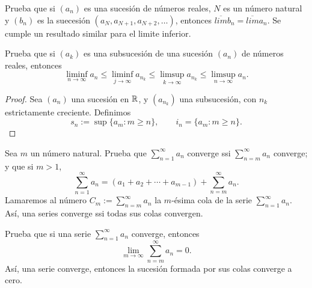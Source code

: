\documentclass[12pt,a4paper]{article}
\begin{document}
    \begin{mdframed}[style=mdpinkbox,frametitle={Ejercicio 5}]
        Prueba que si $(a_{n})$ es una sucesión de números reales, $N$ es un número natural y $(b_{n})$ es la suecesión
        $(a_{N},a_{N+1},a_{N+2},\dots)$, entonces $\overline{lim}b_{n}=\overline{lim}a_{n}$. Se cumple un resultado similar
        para el limite inferior.
    \end{mdframed}

    \begin{mdframed}[style=mdpinkbox,frametitle={Ejercicio 6}]
        Prueba que si $(a_{k})$ es una subsucesión de una sucesión $(a_{n})$ de números reales, entonces
        \begin{equation*}
            \liminf_{n\to\infty}a_{n}\leq\liminf_{j\to\infty}a_{n_{k}}\leq\limsup_{k\to\infty}a_{n_{k}}\leq\limsup_{n\to\infty}a_{n}.
        \end{equation*}
    \end{mdframed}

    \begin{proof}
        Sea $(a_{n})$ una sucesión en $\mathbb{R}$, y $(a_{n_{k}})$ una subsucesión, con $n_{k}$ estrictamente creciente. Definimos
        \begin{equation*}
            s_{n}:=\sup\{a_{m}:m\geq n\},\qquad i_{n}=\{a_{m}:m\geq n\}.
        \end{equation*}
    \end{proof}

    \begin{mdframed}[style=mdpinkbox,frametitle={Ejercicio 7}]
        Sea $m$ un número natural. Prueba que $\sum_{n=1}^{\infty}a_{n}$ converge ssi $\sum_{n=m}^{\infty}a_{n}$ converge;
        y que si $m\gt 1$,
        \begin{equation*}
            \sum_{n=1}^{\infty}a_{n}=(a_{1}+a_{2}+\cdots+a_{m-1})+\sum_{n=m}^{\infty}a_{n}.
        \end{equation*}
        Lamaremos al número $C_{m}:=\sum_{n=m}^{\infty}a_{n}$ la $m$-ésima cola de la serie $\sum_{n=1}^{\infty}a_{n}$.
        Así, una series converge ssi todas sus colas convergen.
    \end{mdframed}

    \begin{mdframed}[style=mdpinkbox,frametitle={Ejercicio 8}]
        Prueba que si  una serie $\sum_{n=1}^{\infty}a_{n}$ converge, entonces
        \begin{equation*}
            \lim_{m\to\infty}\sum_{n=m}^{\infty}a_{n}=0.
        \end{equation*}
        Así, una serie converge, entonces la sucesión formada por sus colas converge a cero.
    \end{mdframed}
\end{document}
